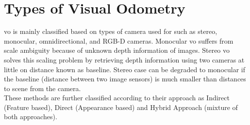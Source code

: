 \section{Types of Visual Odometry}
\label{section:vo_types}
\acrshort{vo} is mainly classified based on types of camera used for such as stereo, monocular, omnidirectional, and RGB-D cameras. Monocular \acrshort{vo} suffers from scale ambiguity because of unknown depth information of images. Stereo \acrshort{vo} solves this scaling problem by retrieving depth information using two cameras at little on distance known as baseline. Stereo case can be degraded to monocular if the baseline (distance between two image sensors) is much smaller than distances to scene from the camera.\\
\newline
These methods are further classified according to their approach as Indirect (Feature based), Direct (Appearance based) and Hybrid Approach (mixture of both approaches).


